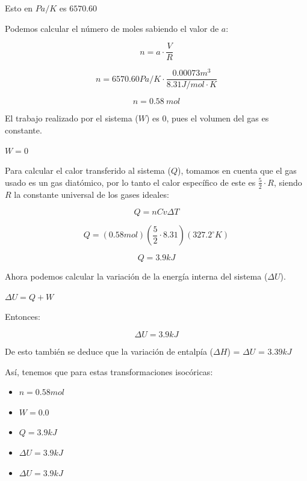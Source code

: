 \documentclass{article}
\begin{document}
Esto en $Pa/K$ es $6570.60$

Podemos calcular el número de moles sabiendo el valor de $a$:

\begin{center}
    $$n = a\cdot \frac{V}{R}$$

    $$n = 6570.60 Pa/K \cdot \frac{0.00073 m^3}{8.31 J/mol\cdot K}$$

    $$n = 0.58\ mol$$
\end{center}


El trabajo realizado por el sistema ($W$) es 0, pues el volumen del gas es constante.


\begin{center}

    $W = 0$

\end{center}



Para calcular el calor transferido al sistema ($Q$), tomamos en cuenta que el gas usado es un gas diatómico, por lo
tanto el calor específico de este es $\frac{5}{2}\cdot R$, siendo $R$ la constante universal de los gases ideales:


\begin{center}
    $$Q = nCv\Delta T$$

    $$Q = (0.58 mol)(\frac{5}{2} \cdot 8.31)(327.2 ^\circ{K})$$

    $$Q = 3.9 kJ$$
\end{center}

Ahora podemos calcular la variación de la energía interna del sistema ($\Delta U$).\\

\begin{center}
    $\Delta U = Q + W$
\end{center}

Entonces:

\begin{center}
    $$\Delta U = 3.9kJ$$
\end{center}

De esto también se deduce que la variación de entalpía ($\Delta H$) = $\Delta U$ = $3.39kJ$


\newpage

Así, tenemos que para estas transformaciones isocóricas:

\begin{itemize}
    \item $n = 0.58 mol$
    \item $W = 0.0$
    \item $Q = 3.9kJ$
    \item $\Delta U = 3.9kJ$
    \item $\Delta U = 3.9kJ$
\end{itemize}
\end{document}
